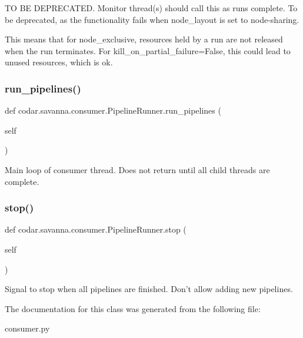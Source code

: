 \begin{DoxyVerb}TO BE DEPRECATED.
Monitor thread(s) should call this as runs
complete. To be deprecated, as the functionality fails when
node_layout is set to node-sharing.

This means that for node_exclusive, resources held by a run are not
released when the run terminates. For kill_on_partial_failure=False,
this could lead to unused resources, which is ok.\end{DoxyVerb}
 \mbox{\label{classcodar_1_1savanna_1_1consumer_1_1_pipeline_runner_af1fe6b71b44a5e849052a36643444db3}} 
\subsubsection{\texorpdfstring{run\+\_\+pipelines()}{run\_pipelines()}}
{\footnotesize\ttfamily def codar.\+savanna.\+consumer.\+Pipeline\+Runner.\+run\+\_\+pipelines (\begin{DoxyParamCaption}\item[{}]{self }\end{DoxyParamCaption})}

\begin{DoxyVerb}Main loop of consumer thread. Does not return until all child
threads are complete.\end{DoxyVerb}
 \mbox{\label{classcodar_1_1savanna_1_1consumer_1_1_pipeline_runner_a62bc31b0b57c9062d05fac14fb50b9b4}} 
\subsubsection{\texorpdfstring{stop()}{stop()}}
{\footnotesize\ttfamily def codar.\+savanna.\+consumer.\+Pipeline\+Runner.\+stop (\begin{DoxyParamCaption}\item[{}]{self }\end{DoxyParamCaption})}

\begin{DoxyVerb}Signal to stop when all pipelines are finished. Don't allow adding
new pipelines.\end{DoxyVerb}
 

The documentation for this class was generated from the following file\+:\begin{DoxyCompactItemize}
\item 
consumer.\+py\end{DoxyCompactItemize}
